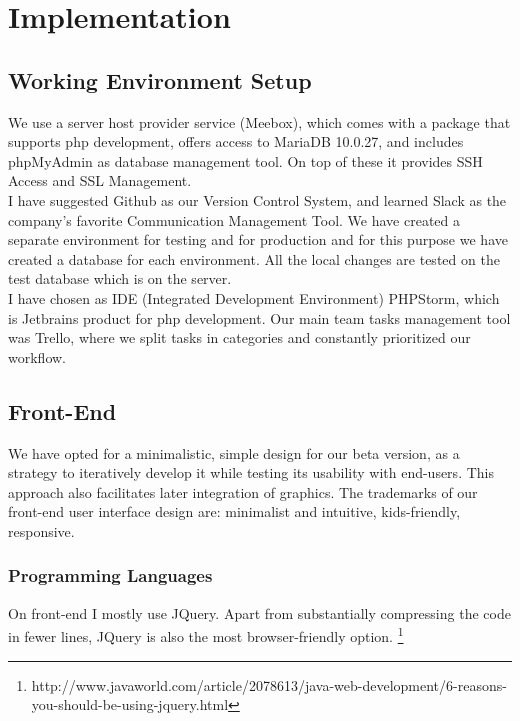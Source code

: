 \chapter{Implementation}

\section{Working Environment Setup} 

We use a server host provider service (Meebox), which comes with a package that supports php development, offers access to MariaDB 10.0.27, and includes phpMyAdmin as database management tool. On top of these it provides SSH Access and SSL Management.\\

I have suggested Github as our Version Control System, and learned Slack as the company's favorite Communication Management Tool. 
We have created a separate environment for testing and for production and for this purpose we have created a database for each environment. All the local changes are tested on the test database which is on the server.\\

I have chosen as IDE (Integrated Development Environment) PHPStorm, which is Jetbrains product for php development. Our main team tasks management tool was Trello, where we split tasks in categories and constantly prioritized our workflow.

\section{Front-End}

We have opted for a minimalistic, simple design for our beta version, as a strategy to iteratively develop it while testing its usability with end-users. This approach also facilitates later integration of graphics. The trademarks of our front-end user interface design are: minimalist and intuitive, kids-friendly, responsive.\\

\subsection{Programming Languages} 

On front-end I mostly use JQuery. Apart from substantially compressing the code in fewer lines, JQuery is also the most browser-friendly option. 
\footnote{http://www.javaworld.com/article/2078613/java-web-development/6-reasons-you-should-be-using-jquery.html}
\\

